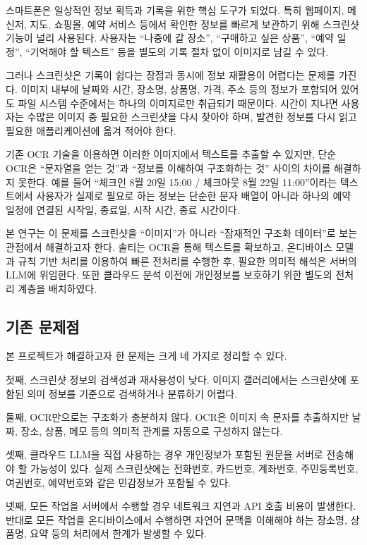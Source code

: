 \documentclass[11pt,a4paper]{article}
\begin{document}
스마트폰은 일상적인 정보 획득과 기록을 위한 핵심 도구가 되었다. 특히 웹페이지, 메신저, 지도, 쇼핑몰, 예약 서비스 등에서 확인한 정보를 빠르게 보관하기 위해 스크린샷 기능이 널리 사용된다. 사용자는 ``나중에 갈 장소'', ``구매하고 싶은 상품'', ``예약 일정'', ``기억해야 할 텍스트'' 등을 별도의 기록 절차 없이 이미지로 남길 수 있다.

그러나 스크린샷은 기록이 쉽다는 장점과 동시에 정보 재활용이 어렵다는 문제를 가진다. 이미지 내부에 날짜와 시간, 장소명, 상품명, 가격, 주소 등의 정보가 포함되어 있어도 파일 시스템 수준에서는 하나의 이미지로만 취급되기 때문이다. 시간이 지나면 사용자는 수많은 이미지 중 필요한 스크린샷을 다시 찾아야 하며, 발견한 정보를 다시 읽고 필요한 애플리케이션에 옮겨 적어야 한다.

기존 OCR 기술을 이용하면 이러한 이미지에서 텍스트를 추출할 수 있지만, 단순 OCR은 ``문자열을 얻는 것''과 ``정보를 이해하여 구조화하는 것'' 사이의 차이를 해결하지 못한다. 예를 들어 ``체크인 8월 20일 15:00 / 체크아웃 8월 22일 11:00''이라는 텍스트에서 사용자가 실제로 필요로 하는 정보는 단순한 문자 배열이 아니라 하나의 예약 일정에 연결된 시작일, 종료일, 시작 시간, 종료 시간이다.

본 연구는 이 문제를 스크린샷을 ``이미지''가 아니라 ``잠재적인 구조화 데이터''로 보는 관점에서 해결하고자 한다. 솔티는 OCR을 통해 텍스트를 확보하고, 온디바이스 모델과 규칙 기반 처리를 이용하여 빠른 전처리를 수행한 후, 필요한 의미적 해석은 서버의 LLM에 위임한다. 또한 클라우드 분석 이전에 개인정보를 보호하기 위한 별도의 전처리 계층을 배치하였다.

\subsection{기존 문제점}

본 프로젝트가 해결하고자 한 문제는 크게 네 가지로 정리할 수 있다.

첫째, 스크린샷 정보의 검색성과 재사용성이 낮다. 이미지 갤러리에서는 스크린샷에 포함된 의미 정보를 기준으로 검색하거나 분류하기 어렵다.

둘째, OCR만으로는 구조화가 충분하지 않다. OCR은 이미지 속 문자를 추출하지만 날짜, 장소, 상품, 메모 등의 의미적 관계를 자동으로 구성하지 않는다.

셋째, 클라우드 LLM을 직접 사용하는 경우 개인정보가 포함된 원문을 서버로 전송해야 할 가능성이 있다. 실제 스크린샷에는 전화번호, 카드번호, 계좌번호, 주민등록번호, 여권번호, 예약번호와 같은 민감정보가 포함될 수 있다.

넷째, 모든 작업을 서버에서 수행할 경우 네트워크 지연과 API 호출 비용이 발생한다. 반대로 모든 작업을 온디바이스에서 수행하면 자연어 문맥을 이해해야 하는 장소명, 상품명, 요약 등의 처리에서 한계가 발생할 수 있다.
\end{document}
